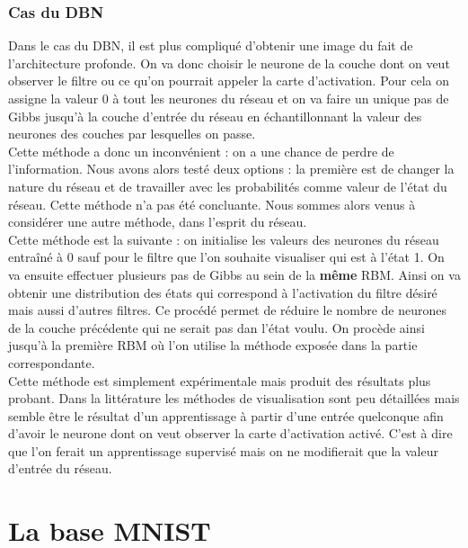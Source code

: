 \documentclass[a4paper,oneside]{report}
\begin{document}
\subsection{Cas du DBN}

Dans le cas du DBN, il est plus compliqué d'obtenir une image du fait de l'architecture profonde. On va donc choisir le neurone de la couche dont  on veut observer le filtre ou ce qu'on pourrait appeler la carte d'activation. Pour cela on assigne la valeur 0 à tout les neurones du réseau et on va faire un unique pas de Gibbs jusqu'à la couche d'entrée du réseau en échantillonnant la valeur des neurones des couches par lesquelles on passe.\\

Cette méthode a donc un inconvénient : on a une chance de perdre de l'information. Nous avons alors testé deux options : la première est de changer la nature du réseau et de travailler avec les probabilités comme valeur de l'état du réseau. Cette méthode n'a pas été concluante. Nous sommes alors venus à considérer une autre méthode, dans l'esprit du réseau. \\

Cette méthode est la suivante : on initialise les valeurs des neurones du réseau entraîné à 0 sauf pour le filtre que l'on souhaite visualiser qui est à l'état 1. On va ensuite effectuer plusieurs pas de Gibbs au sein de la \textbf{même} RBM. Ainsi on va obtenir une distribution des états qui correspond à l'activation du filtre désiré mais aussi d'autres filtres. Ce procédé permet de réduire le nombre de neurones de la couche précédente qui ne serait pas dan l'état voulu. On procède ainsi jusqu'à la première RBM où l'on utilise la méthode exposée dans la partie correspondante.\\

Cette méthode est simplement expérimentale mais produit des résultats plus probant. Dans la littérature les méthodes de visualisation sont peu détaillées mais semble être le résultat d'un apprentissage à partir d'une entrée quelconque afin d'avoir le neurone dont on veut observer la carte d'activation activé. C'est à dire que l'on ferait un apprentissage supervisé mais on ne modifierait que la valeur d'entrée du réseau.




    \appendix

        \chapter{La base MNIST}
\end{document}
